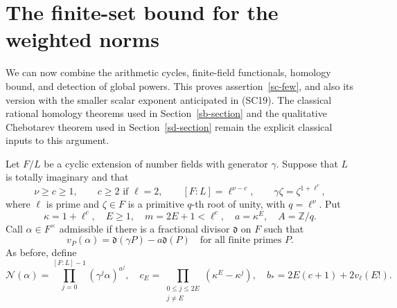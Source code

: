 \section{The finite-set bound for the weighted norms}
\label{sw-section}

We can now combine the arithmetic cycles, finite-field
functionals, homology bound, and detection of global
powers.  This proves assertion~\ref{sc-few}, and also
its version with the smaller scalar exponent anticipated
in (SC19).  The classical rational homology theorems used
in Section~\ref{sb-section} and the qualitative
Chebotarev theorem used in Section~\ref{sd-section}
remain the explicit classical inputs to this argument.

Let \(F/L\) be a cyclic extension of number fields with
generator \(\gamma\).  Suppose that \(L\) is totally
imaginary and that
\[
 \nu\ge c\ge1,\qquad c\ge2\text{ if }\ell=2,
 \qquad [F:L]=\ell^{\nu-c},
 \qquad \gamma\zeta=\zeta^{1+\ell^c},
 \tag{SW1}
\]
where \(\ell\) is prime and \(\zeta\in F\) is a
primitive \(q\)-th root of unity, with \(q=\ell^\nu\).
Put
\[
 \kappa=1+\ell^c,\quad E\ge1,\quad
 m=2E+1<\ell^c,\quad a=\kappa^E,\quad A=\mathbb Z/q.
\]
Call \(\alpha\in F^\times\) admissible if there is a
fractional divisor \(\mathfrak d\) on \(F\) such that
\[
             v_P(\alpha)=\mathfrak d(\gamma P)
                                      -a\mathfrak d(P)
                  \quad\text{for all finite primes }P.
\]
As before, define
\[
 \mathcal N(\alpha)=\prod_{j=0}^{[F:L]-1}
                              (\gamma^j\alpha)^{a^j},
 \quad
 c_E=\prod_{\substack{0\le j\le2E\\j\ne E}}
                              (\kappa^E-\kappa^j),
 \quad
 b_*=2E(c+1)+2v_\ell(E!).
 \tag{SW2}
\]

